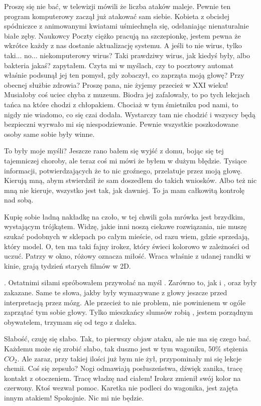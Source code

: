 \begin{dialogue}
\ds{} Proszę się nie bać, w telewizji mówili że liczba ataków maleje. 
Pewnie ten program komputerowy zaczął już atakować sam siebie. \dm{} Kobieta z obcisłej spódniczce z animowanymi kwiatami uśmiechnęła się, odsłaniając nienaturalnie białe zęby. \dm{}
Naukowcy Poczty ciężko pracują na szczepionkę, jestem pewna że wkrótce każdy z nas dostanie aktualizację systemu.
\ds{} A jeśli to nie wirus, tylko taki... no... niekomputerowy wirus? Taki prawdziwy wirus, jak kiedyś były, albo bakteria jakaś? \dm{}
zapytałem. Czyta mi w myślach, czy to pocztowy automat właśnie podsunął jej ten pomysł, gdy zobaczył, co zaprząta moją głowę?
\ds{} Przy obecnej służbie zdrowia? Proszę pana, nie żyjemy przecież w XXI wieku! Musiałoby coś uciec chyba z muzeum.
\dm{} Biodra jej zafalowały, to po tych lekcjach tańca na które chodzi z chłopakiem. \dm{} Chociaż w tym śmietniku pod nami, to nigdy nie wiadomo, co się czai \dm{} dodała.
\ds{} Wystarczy tam nie chodzić i wszyscy będą bezpieczni \dm{} wyrwało mi się niespodziewanie. \dm{} Pewnie wszystkie poszkodowane osoby same sobie były winne.
\end{dialogue}

To były moje myśli? Jeszcze rano bałem się wyjść z domu, bojąc się tej tajemniczej choroby, ale teraz coś mi mówi że byłem w dużym błędzie.
Tysiące informacji, potwierdzających że to nic groźnego, przelatuje przez moją głowę.
Kierują mną, abym stwierdził że sam doszedłem do takich wniosków.
Albo też nic mną nie kieruje, wszystko jest tak, jak dawniej. To ja mam całkowitą kontrolę nad sobą.

Kupię sobie ładną nakładkę na czoło, w tej chwili goła mrówka jest brzydkim, wystającym trójkątem.
Widzę, jakie inni noszą ciekawe rozwiązania, nie muszę szukać podobnych w sklepach po całym mieście, od razu wiem, gdzie sprzedają, który model.
O, ten ma taki fajny irokez, który świeci kolorowo w zależności od uczuć. Patrzy w okno, różowy oznacza miłość.
Wraca właśnie z udanej randki w kinie, grają tydzień starych filmów w 2D.

\censor{}. Ostatnimi siłami spróbowałem przywołać na myśl \censor{}. 
Zarówno to, jak i \censor{}, oraz \censor{} były zakazane.
Same te słowa, jakby były wymazywane z głowy jeszcze przed interpretacją przez mózg.
Ale przecież to nie problem, nie powinienem w ogóle zaprzątać tym sobie głowy. 
Tylko mieszkańcy slumsów robią \censor{}, jestem porządnym obywatelem, trzymam się od tego z daleka.

Słabość, czuję się słabo.
Tak, to pierwszy objaw ataku, ale nie ma się czego bać.
Każdemu może się zrobić słabo, tak duszno jest w tym wagoniku, 50\% stężenia $CO_2$.
Ale zaraz, przy takiej ilości już bym nie żył, przypominały mi się lekcje chemii. Coś się zepsuło?
Nogi odmawiają posłuszeństwa, dźwięk zanika, tracę kontakt z otoczeniem.
Tracę władzę nad ciałem! Irokez zmienił swój kolor na czerwony. Ktoś wezwał pomoc.
Karetka nie podleci do wagonika, jest zajęta innym atakiem!
Spokojnie. Nic mi nie będzie.

